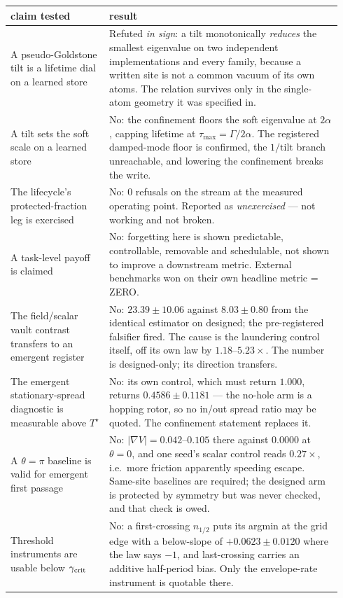 {\begin{center}
\end{center}
\begin{center}
\begin{tabular}{p{0.28\linewidth}p{0.66\linewidth}}
\toprule
claim tested & result\\
\midrule
A pseudo-Goldstone tilt is a lifetime dial on a learned store & Refuted \emph{in sign}: a tilt monotonically \emph{reduces} the smallest eigenvalue on two independent implementations and every family, because a written site is not a common vacuum of its own atoms. The relation survives only in the single-atom geometry it was specified in.\\
A tilt sets the soft scale on a learned store & No: the confinement floors the soft eigenvalue at $2\alpha$, capping lifetime at $\tau_{\max}=\Gamma/2\alpha$. The registered damped-mode floor is confirmed, the $1/\text{tilt}$ branch unreachable, and lowering the confinement breaks the write.\\
The lifecycle's protected-fraction leg is exercised & No: 0 refusals on the stream at the measured operating point. Reported as \emph{unexercised} --- not working and not broken.\\
A task-level payoff is claimed & No: forgetting here is shown predictable, controllable, removable and schedulable, not shown to improve a downstream metric. External benchmarks won on their own headline metric = ZERO.\\
The field/scalar vault contrast transfers to an emergent register & No: $23.39\pm10.06$ against $8.03\pm0.80$ from the identical estimator on designed; the pre-registered falsifier fired. The cause is the laundering control itself, off its own law by $1.18$--$5.23\times$. The number is designed-only; its direction transfers.\\
The emergent stationary-spread diagnostic is measurable above $T^\star$ & No: its own control, which must return $1.000$, returns $0.4586\pm0.1181$ --- the no-hole arm is a hopping rotor, so no in/out spread ratio may be quoted. The confinement statement replaces it.\\
A $\theta=\pi$ baseline is valid for emergent first passage & No: $|\nabla V|=0.042$--$0.105$ there against $0.0000$ at $\theta=0$, and one seed's scalar control reads $0.27\times$, i.e.\ more friction apparently speeding escape. Same-site baselines are required; the designed arm is protected by symmetry but was never checked, and that check is owed.\\
Threshold instruments are usable below $\gamma_{\rm crit}$ & No: a first-crossing $n_{1/2}$ puts its argmin at the grid edge with a below-slope of $+0.0623\pm0.0120$ where the law says $-1$, and last-crossing carries an additive half-period bias. Only the envelope-rate instrument is quotable there.\\

\end{tabular}
\end{center}}
